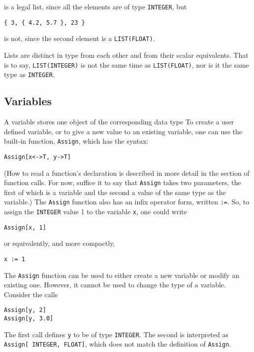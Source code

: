 \noindent is a legal list, since all the elements are of type 
{\tt INTEGER}, but

\begin{verbatim}
{ 3, { 4.2, 5.7 }, 23 }
\end{verbatim}

\noindent is not, since the second element is a {\tt LIST(FLOAT)}.

Lists are distinct in type from each other and from their scalar
equivalents.  That is to say, {\tt LIST(INTEGER)} is not the same time
as {\tt LIST(FLOAT)}, nor is it the same type as {\tt INTEGER}.

\subsection{Variables}

A variable stores one object of the corresponding data type
To create a user defined variable, or to give
a new value to an existing variable, one can use the built-in
function,
\verb+Assign+, which has the syntax:
\begin{verbatim}
Assign[x<->T, y->T]
\end{verbatim}

\noindent (How to read a function's declaration is described in more
detail in the section of function calls.  For now, suffice it to say that
{\tt Assign} takes two parameters, the first of which is a variable and
the second a value of the same type as the variable.)  The {\tt Assign}
function also has an infix operator form, written {\tt :=}.  So, to assign
the {\tt INTEGER} value 1 to the variable {\tt x}, one could write

\begin{verbatim}
Assign[x, 1]
\end{verbatim}

\noindent or equivalently, and more compactly,

\begin{verbatim}
x := 1
\end{verbatim}

The {\tt Assign} function can be used to either create a new variable or
modify an existing one.  However, it cannot be used to change the type
of a variable.  Consider the calls

\begin{verbatim}
Assign[y, 2]
Assign[y, 3.0]
\end{verbatim}

\noindent The first call defines {\tt y} to be of type {\tt INTEGER}.  The
second is interpreted as {\tt Assign[ INTEGER, FLOAT]}, which does
not match the definition of {\tt Assign}.

